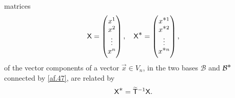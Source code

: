matrices
\begin{align}\label{af.47}
 \mathsf{X}=\begin{pmatrix}
x^1\\x^2\\ \vdots\\x^n
\end{pmatrix}, \quad \mathsf{X}^{\textstyle \ast}=\begin{pmatrix}
x^{{\textstyle \ast} 1}\\x^{{\textstyle \ast} 2}\\ \vdots\\x^{{\textstyle \ast} n}
\end{pmatrix},
\end{align}
of the vector components of a vector $\vec{x}\in V_n$, in 
the 
two bases $\mathcal{B}$ and $\mathcal{B}^{\textstyle \ast}$ connected by 
\eqref{af.47}, are related by
 \begin{align}
\mathsf{X}^{\textstyle \ast}=
\widetilde{\mathsf{T}}^{-1}\mathsf{X}.
 \end{align}

